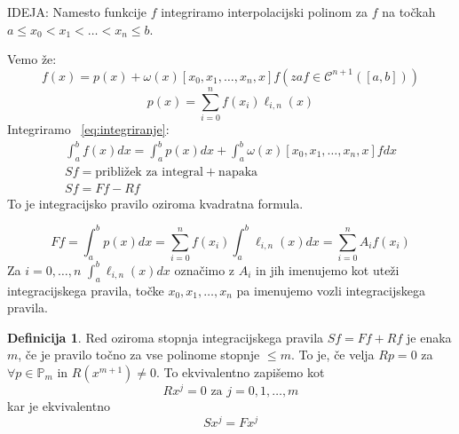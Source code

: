 \documentclass[a4paper,12pt]{article}
\theoremstyle{definition}
\newtheorem{defn}[counter]{Definicija}
\theoremstyle{remark}
\newcommand{\Pp}{\mathbb{P}}
\begin{document}
IDEJA: Namesto funkcije $f$ integriramo interpolacijski polinom za $f$ na točkah $a \leq x_0 < x_1 < \dots < x_n \leq b$.

Vemo že:
\begin{equation}
    f(x) = p(x) + \omega(x) [x_0, x_1, \dots, x_n, x] f (za f \in \mathscr{C}^{n+1}([a, b])) \label{eq:integriranje}
\end{equation}
\begin{equation*}
    p(x) = \sum_{i=0}^{n} f(x_i) \ell_{i, n}(x)
\end{equation*}
Integriramo ~\ref{eq:integriranje}:
\begin{gather*}
    \int_{a}^{b} f(x) dx = \int_{a}^{b} p(x) dx + \int_{a}^{b} \omega(x) [x_0, x_1, \dots, x_n, x] f dx \\
    Sf = \text{približek za integral} + \text{napaka} \\
    Sf = Ff - Rf
\end{gather*}
To je integracijsko pravilo oziroma kvadratna formula.

\begin{equation*}
    Ff = \int_{a}^{b} p(x) dx = \sum_{i=0}^{n} f(x_i) \int_{a}^{b} \ell_{i, n} (x) dx = \sum_{i=0}^{n} A_i f(x_i)
\end{equation*}
Za $i = 0, \dots, n$ $\int_{a}^{b} \ell_{i, n} (x) dx$ označimo z $A_i$ in jih imenujemo kot uteži integracijskega pravila, točke 
$x_0, x_1, \dots, x_n$ pa imenujemo vozli integracijskega pravila.

\begin{defn}
    Red oziroma stopnja integracijskega pravila $Sf = Ff + Rf$ je enaka $m$, če je pravilo točno za vse polinome stopnje $\leq m$. To je,
    če velja $Rp = 0$ za $\forall p \in \Pp_m$ in $R(x^{m+1}) \neq 0$. To ekvivalentno zapišemo kot
    \begin{equation*}
        Rx^j = 0 \text{ za } j = 0, 1, \dots, m
    \end{equation*}
    kar je ekvivalentno
    \begin{equation*}
        S x^j = F x^j
    \end{equation*}
\end{defn}
\end{document}

